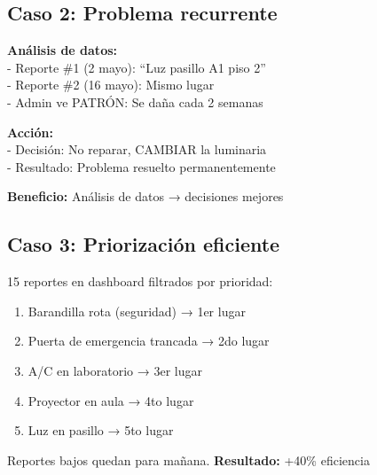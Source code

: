 \documentclass[12pt, a4paper, spanish]{article}
\begin{document}
\subsection{Caso 2: Problema recurrente}

\begin{tcolorbox}[colback=amarillo!10, colframe=amarillo!50, title=Problema: Misma luz se daña cada 2 semanas]
\textbf{Análisis de datos:} \\
- Reporte \#1 (2 mayo): ``Luz pasillo A1 piso 2'' \\
- Reporte \#2 (16 mayo): Mismo lugar \\
- Admin ve PATRÓN: Se daña cada 2 semanas

\textbf{Acción:} \\
- Decisión: No reparar, CAMBIAR la luminaria \\
- Resultado: Problema resuelto permanentemente

\textbf{Beneficio:} Análisis de datos → decisiones mejores
\end{tcolorbox}

\subsection{Caso 3: Priorización eficiente}

\begin{tcolorbox}[colback=verde!10, colframe=verde!50, title=Problema: Técnico con 15 reportes debe atender solo 5]
15 reportes en dashboard filtrados por prioridad:

\begin{enumerate}
    \item [\textcolor{rojo}{\textbf{CRÍTICA}}] Barandilla rota (seguridad) → 1er lugar
    \item [\textcolor{rojo}{\textbf{CRÍTICA}}] Puerta de emergencia trancada → 2do lugar
    \item [\textcolor{orange}{\textbf{ALTA}}] A/C en laboratorio → 3er lugar
    \item [\textcolor{orange}{\textbf{ALTA}}] Proyector en aula → 4to lugar
    \item [\textcolor{orange}{\textbf{ALTA}}] Luz en pasillo → 5to lugar
\end{enumerate}

Reportes bajos quedan para mañana. \textbf{Resultado:} +40\% eficiencia
\end{tcolorbox}

\newpage

\end{document}
